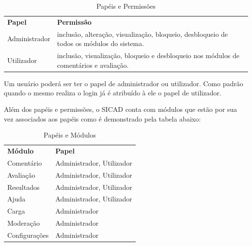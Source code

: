\documentclass[12pt, a4paper]{report}
\begin{document}
\begin{table}[h]
 \centering
 {\renewcommand\arraystretch{1.25}
 \begin{tabular}{ l l }
  \cline{1-1}\cline{2-2}  
    \multicolumn{1}{|p{3.850cm}|}{\textbf{Papel} \centering } &
    \multicolumn{1}{p{4.217cm}|}{\textbf{Permissão} \centering }
  \\  
  \cline{1-1}\cline{2-2}  
    \multicolumn{1}{|p{3.850cm}|}{Administrador} &
    \multicolumn{1}{p{4.217cm}|}{inclusão, alteração, visualização, bloqueio, desbloqueio de todos os módulos do sistema.}
  \\  
  \cline{1-1}\cline{2-2}  
    \multicolumn{1}{|p{3.850cm}|}{Utilizador} &
    \multicolumn{1}{p{4.217cm}|}{inclusão, visualização, bloqueio e desbloqueio nos módulos de comentários e avaliação.}
  \\  
  \hline
 \end{tabular} }
 \caption{Papéis e Permissões}
\end{table}
\par Um usuário poderá ser ter o papel de administrador ou utilizador. Como padrão quando o mesmo realiza o login já é atribuído à ele o papel de utilizador.
\par Além dos papéis e permissões, o SICAD conta com módulos que estão por sua vez associados aos papéis como é demonstrado pela tabela abaixo:
\begin{table}[h]
 \centering
 {\renewcommand\arraystretch{1.25}
 
 \begin{tabular}{ l l }
  \cline{1-1}\cline{2-2}  
    \multicolumn{1}{|p{3.850cm}|}{\textbf{Módulo} \centering } &
    \multicolumn{1}{p{7.217cm}|}{\textbf{Papel} \centering }
  \\  
  \cline{1-1}\cline{2-2}  
    \multicolumn{1}{|p{3.850cm}|}{Comentário} &
    \multicolumn{1}{p{7.217cm}|}{Administrador, Utilizador}
  \\  
  \cline{1-1}\cline{2-2}  
    \multicolumn{1}{|p{3.850cm}|}{Avaliação} &
    \multicolumn{1}{p{7.217cm}|}{Administrador, Utilizador}
  \\  
    \cline{1-1}\cline{2-2}  
    \multicolumn{1}{|p{3.850cm}|}{Resultados} &
    \multicolumn{1}{p{7.217cm}|}{Administrador, Utilizador}
  \\  
    \cline{1-1}\cline{2-2}  
    \multicolumn{1}{|p{3.850cm}|}{Ajuda} &
    \multicolumn{1}{p{7.217cm}|}{Administrador, Utilizador}
  \\  
    \cline{1-1}\cline{2-2}  
    \multicolumn{1}{|p{3.850cm}|}{Carga} &
    \multicolumn{1}{p{7.217cm}|}{Administrador}
  \\  
    \cline{1-1}\cline{2-2}  
    \multicolumn{1}{|p{3.850cm}|}{Moderação} &
    \multicolumn{1}{p{7.217cm}|}{Administrador}
  \\  
    \cline{1-1}\cline{2-2}  
    \multicolumn{1}{|p{3.850cm}|}{Configurações} &
    \multicolumn{1}{p{7.217cm}|}{Administrador}
  \\  
  \hline
 \end{tabular} }
 \caption{Papéis e Módulos }
\end{table}
\end{document}
